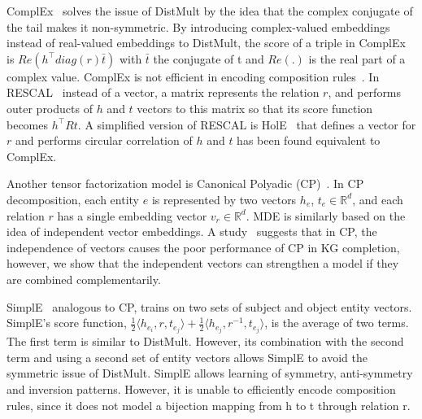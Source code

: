 \documentclass{ecai}
\begin{document}
ComplEx~\cite{trouillon2016complex} solves the issue of DistMult by the idea that the complex conjugate of the tail makes it non-symmetric. By introducing complex-valued embeddings instead of real-valued embeddings to DistMult, the score of a triple in ComplEx is $Re(h^\top diag(r)\bar{t})$ with $\bar{t}$ the conjugate of t and $Re(.)$ is the real part of a complex value. ComplEx is not efficient in encoding composition rules~\cite{sun2019rotate}.
In RESCAL~\cite{nickel2011three} instead of a vector, a matrix represents the relation $r$, and performs outer products of $h$ and $t$ vectors to this matrix so that its score function becomes $h^\top R t$. A simplified version of RESCAL is HolE~\cite{nickel2016holographic} that defines a vector for $r$ and performs circular correlation of $h$ and $t$ has been found equivalent \cite{hayashi2017equivalence} to ComplEx. 
 
Another tensor factorization model is Canonical Polyadic (CP)~\cite{hitchcock1927expression}. In CP decomposition, each entity $e$ is represented by two vectors $h_e$, $t_e \in \mathbb{R}^d$, and each relation $r$ has a single embedding vector $ v_r \in \mathbb{R}^d $. MDE is similarly based on the idea of independent vector embeddings. A study~\cite{trouillon2017knowledge} suggests that in CP, the independence of vectors causes the poor performance of CP in KG completion, however, we show that the independent vectors can strengthen a model if they are combined complementarily.

SimplE~\cite{kazemi2018simple} analogous to CP, trains on two sets of subject and object entity vectors. SimplE's score function, $\frac{1}{2} \langle h_{e_i},r,t_{e_j} \rangle + \frac{1}{2} \langle h_{e_j},r^{-1},t_{e_j} \rangle$, is the average of two terms. The first term is similar to DistMult. However, its combination with the second term and using a second set of entity vectors allows SimplE to avoid the symmetric issue of DistMult. SimplE allows learning of symmetry, anti-symmetry and inversion patterns. However, it is unable to efficiently encode composition rules, since it does not model a bijection mapping from h to t through relation r.
\end{document}
